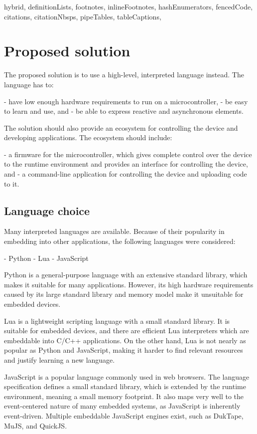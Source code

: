 \begin{markdown*}{%
  hybrid,
  definitionLists,
  footnotes,
  inlineFootnotes,
  hashEnumerators,
  fencedCode,
  citations,
  citationNbsps,
  pipeTables,
  tableCaptions,
}
\chapter{Proposed solution}

The proposed solution is to use a high-level, interpreted language instead. The language has to:

  - have low enough hardware requirements to run on a microcontroller,
  - be easy to learn and use, and
  - be able to express reactive and asynchronous elements.

\noindent
The solution should also provide an ecosystem for controlling the device and developing applications. The ecosystem should include:

  - a firmware for the microcontroller, which gives complete control over the device to the runtime environment and provides an interface for controlling the device, and
  - a command-line application for controlling the device and uploading code to it.

\section{Language choice}

Many interpreted languages are available. Because of their popularity in embedding into other applications, the following languages were considered:

  - Python
  - Lua
  - JavaScript

Python is a general-purpose language with an extensive standard library, which makes it suitable for many applications. However, its high hardware requirements caused by its large standard library and memory model make it unsuitable for embedded devices.

Lua is a lightweight scripting language with a small standard library. It is suitable for embedded devices, and there are efficient Lua interpreters which are embeddable into C/C++ applications. On the other hand, Lua is not nearly as popular as Python and JavaScript, making it harder to find relevant resources and justify learning a new language.

JavaScript is a popular language commonly used in web browsers. The language specification defines a small standard library, which is extended by the runtime environment, meaning a small memory footprint. It also maps very well to the event-centered nature of many embedded systems, as JavaScript is inherently event-driven. Multiple embeddable JavaScript engines exist, such as DukTape, MuJS, and QuickJS.


\end{markdown*}
